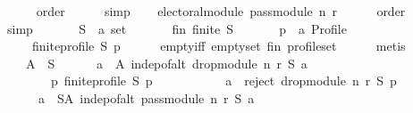 \begin{isabellebody}
\ \ \ \ \isamarkupfalse%
\ order\isanewline
\ \ \ \ \isamarkupfalse%
\ simp\isanewline
{}\isamarkupfalse%
\isanewline
\ \ \isamarkupfalse%
\ {\isachardoublequoteopen}electoral{\isacharunderscore}{\kern0pt}module\ {\isacharparenleft}{\kern0pt}pass{\isacharunderscore}{\kern0pt}module\ n\ r{\isacharparenright}{\kern0pt}{\isachardoublequoteclose}\isanewline
\ \ \ \ \isamarkupfalse%
\ order\isanewline
\ \ \ \ \isamarkupfalse%
\ simp\isanewline
{}\isamarkupfalse%
\isanewline
\ \ \isamarkupfalse%
\isanewline
\ \ \ \ S\ {\isacharcolon}{\kern0pt}{\isacharcolon}{\kern0pt}\ {\isachardoublequoteopen}{\isacharprime}{\kern0pt}a\ set{\isachardoublequoteclose}\isanewline
\ \ \isamarkupfalse%
\isanewline
\ \ \ \ fin{\isacharcolon}{\kern0pt}\ {\isachardoublequoteopen}finite\ S{\isachardoublequoteclose}\isanewline
\ \ \isamarkupfalse%
\isanewline
\ \ \ \ p\ {\isacharcolon}{\kern0pt}{\isacharcolon}{\kern0pt}\ {\isachardoublequoteopen}{\isacharprime}{\kern0pt}a\ Profile{\isachardoublequoteclose}\isanewline
\ \ \ \ \ {\isachardoublequoteopen}finite{\isacharunderscore}{\kern0pt}profile\ S\ p{\isachardoublequoteclose}\isanewline
\ \ \ \ \isamarkupfalse%
\ empty{\isacharunderscore}{\kern0pt}iff\ empty{\isacharunderscore}{\kern0pt}set\ fin\ profile{\isacharunderscore}{\kern0pt}set\isanewline
\ \ \ \ \isamarkupfalse%
\ metis\isanewline
\ \ \isamarkupfalse%
\isanewline
\ \ \ \ {\isachardoublequoteopen}{\isasymexists}A\ {\isasymsubseteq}\ S{\isachardot}{\kern0pt}\isanewline
\ \ \ \ \ \ {\isacharparenleft}{\kern0pt}{\isasymforall}a\ {\isasymin}\ A{\isachardot}{\kern0pt}\ indep{\isacharunderscore}{\kern0pt}of{\isacharunderscore}{\kern0pt}alt\ {\isacharparenleft}{\kern0pt}drop{\isacharunderscore}{\kern0pt}module\ n\ r{\isacharparenright}{\kern0pt}\ S\ a\ {\isasymand}\isanewline
\ \ \ \ \ \ \ \ {\isacharparenleft}{\kern0pt}{\isasymforall}p{\isachardot}{\kern0pt}\ finite{\isacharunderscore}{\kern0pt}profile\ S\ p\ {\isasymlongrightarrow}\isanewline
\ \ \ \ \ \ \ \ \ \ a\ {\isasymin}\ reject\ {\isacharparenleft}{\kern0pt}drop{\isacharunderscore}{\kern0pt}module\ n\ r{\isacharparenright}{\kern0pt}\ S\ p{\isacharparenright}{\kern0pt}{\isacharparenright}{\kern0pt}\ {\isasymand}\isanewline
\ \ \ \ \ \ {\isacharparenleft}{\kern0pt}{\isasymforall}a\ {\isasymin}\ S{\isacharminus}{\kern0pt}A{\isachardot}{\kern0pt}\ indep{\isacharunderscore}{\kern0pt}of{\isacharunderscore}{\kern0pt}alt\ {\isacharparenleft}{\kern0pt}pass{\isacharunderscore}{\kern0pt}module\ n\ r{\isacharparenright}{\kern0pt}\ S\ a\ {\isasymand}\isanewline

\end{isabellebody}
